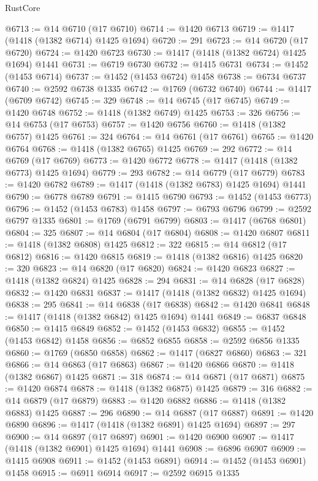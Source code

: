 \begin{lexlean}{RustCore}
\begin{coremodule}
@6713 := @14 @6710 (@17 @6710)
@6714 := @1420 @6713
@6719 := @1417 (@1418 (@1382 @6714) @1425 @1694)
@6720 := 291
@6723 := @14 @6720 (@17 @6720)
@6724 := @1420 @6723
@6730 := @1417 (@1418 (@1382 @6724) @1425 @1694) @1441
@6731 := @6719 @6730
@6732 := @1415 @6731
@6734 := @1452 (@1453 @6714)
@6737 := @1452 (@1453 @6724) @1458
@6738 := @6734 @6737
@6740 := @2592 @6738 @1335
@6742 := @1769 (@6732 @6740)
@6744 := @1417 (@6709 @6742)
@6745 := 329
@6748 := @14 @6745 (@17 @6745)
@6749 := @1420 @6748
@6752 := @1418 (@1382 @6749) @1425
@6753 := 326
@6756 := @14 @6753 (@17 @6753)
@6757 := @1420 @6756
@6760 := @1418 (@1382 @6757) @1425
@6761 := 324
@6764 := @14 @6761 (@17 @6761)
@6765 := @1420 @6764
@6768 := @1418 (@1382 @6765) @1425
@6769 := 292
@6772 := @14 @6769 (@17 @6769)
@6773 := @1420 @6772
@6778 := @1417 (@1418 (@1382 @6773) @1425 @1694)
@6779 := 293
@6782 := @14 @6779 (@17 @6779)
@6783 := @1420 @6782
@6789 := @1417 (@1418 (@1382 @6783) @1425 @1694) @1441
@6790 := @6778 @6789
@6791 := @1415 @6790
@6793 := @1452 (@1453 @6773)
@6796 := @1452 (@1453 @6783) @1458
@6797 := @6793 @6796
@6799 := @2592 @6797 @1335
@6801 := @1769 (@6791 @6799)
@6803 := @1417 (@6768 @6801)
@6804 := 325
@6807 := @14 @6804 (@17 @6804)
@6808 := @1420 @6807
@6811 := @1418 (@1382 @6808) @1425
@6812 := 322
@6815 := @14 @6812 (@17 @6812)
@6816 := @1420 @6815
@6819 := @1418 (@1382 @6816) @1425
@6820 := 320
@6823 := @14 @6820 (@17 @6820)
@6824 := @1420 @6823
@6827 := @1418 (@1382 @6824) @1425
@6828 := 294
@6831 := @14 @6828 (@17 @6828)
@6832 := @1420 @6831
@6837 := @1417 (@1418 (@1382 @6832) @1425 @1694)
@6838 := 295
@6841 := @14 @6838 (@17 @6838)
@6842 := @1420 @6841
@6848 := @1417 (@1418 (@1382 @6842) @1425 @1694) @1441
@6849 := @6837 @6848
@6850 := @1415 @6849
@6852 := @1452 (@1453 @6832)
@6855 := @1452 (@1453 @6842) @1458
@6856 := @6852 @6855
@6858 := @2592 @6856 @1335
@6860 := @1769 (@6850 @6858)
@6862 := @1417 (@6827 @6860)
@6863 := 321
@6866 := @14 @6863 (@17 @6863)
@6867 := @1420 @6866
@6870 := @1418 (@1382 @6867) @1425
@6871 := 318
@6874 := @14 @6871 (@17 @6871)
@6875 := @1420 @6874
@6878 := @1418 (@1382 @6875) @1425
@6879 := 316
@6882 := @14 @6879 (@17 @6879)
@6883 := @1420 @6882
@6886 := @1418 (@1382 @6883) @1425
@6887 := 296
@6890 := @14 @6887 (@17 @6887)
@6891 := @1420 @6890
@6896 := @1417 (@1418 (@1382 @6891) @1425 @1694)
@6897 := 297
@6900 := @14 @6897 (@17 @6897)
@6901 := @1420 @6900
@6907 := @1417 (@1418 (@1382 @6901) @1425 @1694) @1441
@6908 := @6896 @6907
@6909 := @1415 @6908
@6911 := @1452 (@1453 @6891)
@6914 := @1452 (@1453 @6901) @1458
@6915 := @6911 @6914
@6917 := @2592 @6915 @1335

\end{coremodule}
\end{lexlean}
